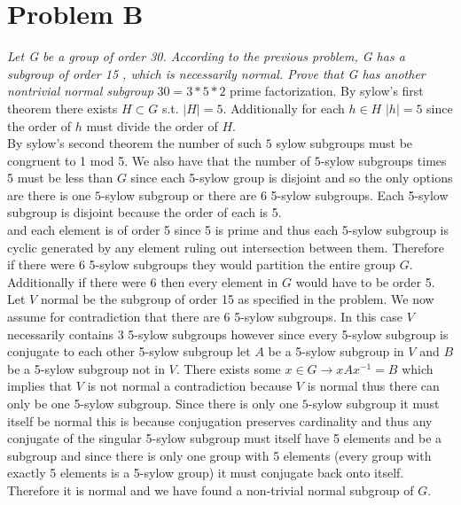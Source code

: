 \documentclass{article}
\begin{document}
    \section{Problem B}
    \emph{
        Let G be a group of order 30. According to the previous problem, G has a subgroup of order 15
        , which is necessarily normal.  Prove that G has another nontrivial normal subgroup
    }
    $30 = 3*5*2$ prime factorization. 
    By sylow's first theorem there exists $H \subset G$ s.t. $|H| = 5$. Additionally for each $h \in H$ $|h| = 5$ since the order of $h$ must divide the order of $H$.\\
    By sylow's second theorem the number of such $5$ sylow subgroups must be congruent to 1 mod 5. We also have that the number of $5$-sylow subgroups times 5 must be less than $G$ since each 5-sylow group is disjoint and
    so the only options are there is one $5$-sylow subgroup or there are 6 5-sylow subgroups. Each 5-sylow subgroup is disjoint because the order of each is 5.\\
    and each element is of order 5 since 5 is prime and thus each 5-sylow subgroup is cyclic generated by any element ruling out intersection between them.
    Therefore if there were 6 5-sylow subgroups they would partition the entire group $G$. Additionally if there were 6 then every element in $G$ would have to be order 5.
    Let $V$ normal be the subgroup of order 15 as specified in the problem. We now assume for contradiction that there are 6 5-sylow subgroups. In this case $V$ necessarily contains
    3 5-sylow subgroups however since every 5-sylow subgroup is conjugate to each other 5-sylow subgroup let $A$ be a 5-sylow subgroup in $V$ and $B$ be a 5-sylow subgroup not in $V$.
    There exists some $x \in G \rightarrow xAx^{-1} = B$ which implies that $V$ is not normal a contradiction because $V$ is normal thus there can only be one 5-sylow subgroup.
    Since there is only one $5$-sylow subgroup it must itself be normal this is because conjugation preserves cardinality and thus any conjugate of the singular 5-sylow subgroup
    must itself have 5 elements and be a subgroup and since there is only one group with 5 elements (every group with exactly 5 elements is a 5-sylow group) it must conjugate back onto itself.
    Therefore it is normal and we have found a non-trivial normal subgroup of $G$.
\end{document}
